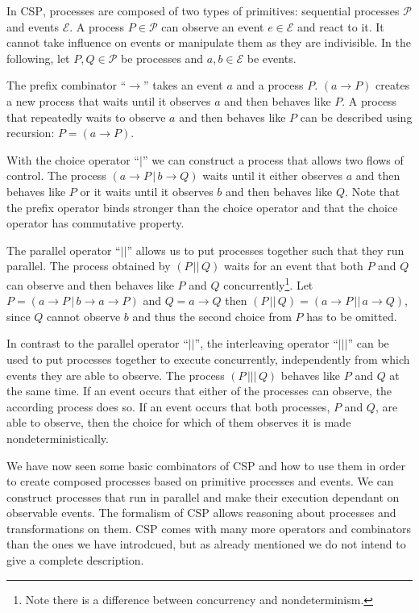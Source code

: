 In \textsc{CSP}, processes are composed of two types of primitives: sequential processes $\mathcal{P}$ and events $\mathcal{E}$. A process $P \in \mathcal{P}$ can observe an event $e \in \mathcal{E}$ and react to it. It cannot take influence on events or manipulate them as they are indivisible. In the following, let $P, Q \in \mathcal{P}$ be processes and $a,b \in \mathcal{E}$ be events.

The prefix combinator \enquote{$\to$} takes an event $a$ and a process $P$. $\left( a \to P \right)$ creates a new process that waits until it observes $a$ and then behaves like $P$. A process that repeatedly waits to observe $a$ and then behaves like $P$ can be described using recursion: $P = \left( a \to P \right)$.

With the choice operator \enquote{$|$} we can construct a process that allows two flows of control. The process $\left( a \to P \,|\, b \to Q \right)$ waits until it either observes $a$ and then behaves like $P$ or it waits until it observes $b$ and then behaves like $Q$. Note that the prefix operator binds stronger than the choice operator and that the choice operator has commutative property.

The parallel operator \enquote{$||$} allows us to put processes together such that they run parallel. The process obtained by $\left( P \,||\, Q \right)$ waits for an event that both $P$ and $Q$ can observe and then behaves like $P$ and $Q$ concurrently\footnote{Note there is a difference between concurrency and nondeterminism.}. Let $P = \left( a \to P \,|\, b \to a \to P \right)$ and $Q = a \to Q$ then $\left( P \,||\, Q \right) = \left( a \to P \,||\, a \to Q \right)$, since $Q$ cannot observe $b$ and thus the second choice from $P$ has to be omitted.

In contrast to the parallel operator \enquote{$||$}, the interleaving operator \enquote{$|||$} can be used to put processes together to execute concurrently, independently from which events they are able to observe. The process $\left( P \,|||\, Q \right)$ behaves like $P$ and $Q$ at the same time. If an event occurs that either of the processes can observe, the according process does so. If an event occurs that both processes, $P$ and $Q$, are able to observe, then the choice for which of them observes it is made nondeterministically.

We have now seen some basic combinators of \textsc{CSP} and how to use them in order to create composed processes based on primitive processes and events. We can construct processes that run in parallel and make their execution dependant on observable events. The formalism of \textsc{CSP} allows reasoning about processes and transformations on them. \textsc{CSP} comes with many more operators and combinators than the ones we have introdcued, but as already mentioned we do not intend to give a complete description.


